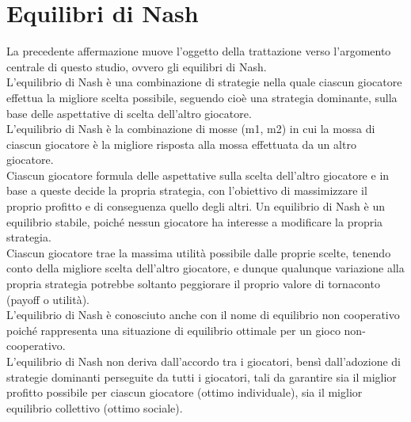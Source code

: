 \section{Equilibri di Nash}
\justify
La precedente affermazione muove l'oggetto della trattazione verso l'argomento centrale di questo studio, ovvero gli equilibri di Nash.\\
L'equilibrio di Nash è una combinazione di strategie nella quale ciascun giocatore effettua la migliore scelta possibile, seguendo cioè una strategia dominante, sulla base delle aspettative di scelta dell'altro giocatore.\\
L'equilibrio di Nash è la combinazione di mosse (m1, m2) in cui la mossa di ciascun giocatore è la migliore risposta alla mossa effettuata da un altro giocatore.\\
Ciascun giocatore formula delle aspettative sulla scelta dell'altro giocatore e in base a queste decide la propria strategia, con l'obiettivo di massimizzare il proprio profitto e di conseguenza quello degli altri.
Un equilibrio di Nash è un equilibrio stabile, poiché nessun giocatore ha interesse a modificare la propria strategia.\\
Ciascun giocatore trae la massima utilità possibile dalle proprie scelte, tenendo conto della migliore scelta dell'altro giocatore, e dunque qualunque variazione alla propria strategia potrebbe soltanto peggiorare il proprio valore di tornaconto (payoff o utilità).\\
L'equilibrio di Nash è conosciuto anche con il nome di equilibrio non cooperativo poiché rappresenta una situazione di equilibrio ottimale per un gioco non-cooperativo.\\
L'equilibrio di Nash non deriva dall'accordo tra i giocatori, bensì dall'adozione di strategie dominanti perseguite da tutti i giocatori, tali da garantire sia il miglior profitto possibile per ciascun giocatore (ottimo individuale), sia il miglior equilibrio collettivo (ottimo sociale).\newline

